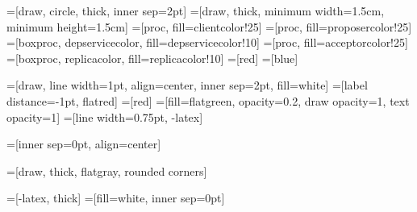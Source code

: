 =[draw, circle, thick, inner sep=2pt]
=[draw, thick, minimum width=1.5cm, minimum height=1.5cm]
=[proc, fill=clientcolor!25]
=[proc, fill=proposercolor!25]
=[boxproc, depservicecolor, fill=depservicecolor!10]
=[proc, fill=acceptorcolor!25]
=[boxproc, replicacolor, fill=replicacolor!10]
=[red]
=[blue]

=[draw, line width=1pt, align=center, inner sep=2pt, fill=white]
=[label distance=-1pt, flatred]
=[red]
=[fill=flatgreen, opacity=0.2, draw opacity=1,
                      text opacity=1]
=[line width=0.75pt, -latex]

=[inner sep=0pt, align=center]

=[draw, thick, flatgray, rounded corners]

=[-latex, thick]
=[fill=white, inner sep=0pt]

